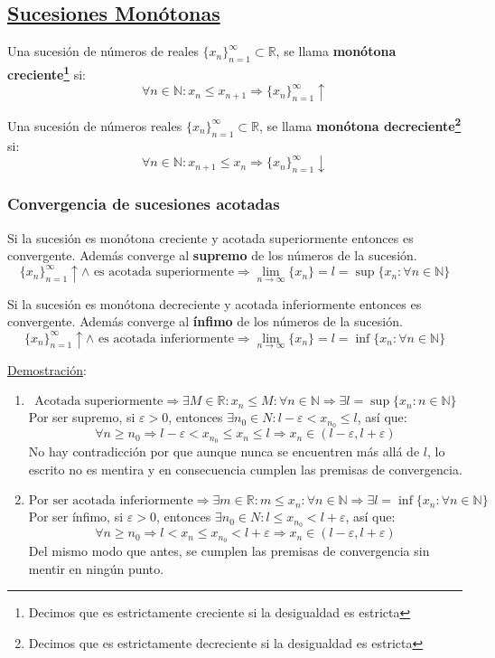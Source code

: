 \documentclass[10pt,a4paper,openright]{book}
\begin{document}
\subsection*{\underline{Sucesiones Monótonas}}
Una sucesión de números de reales $\{x_n\}_{n=1}^\infty\subset \mathbb R$, se llama \textbf{monótona creciente\footnote{Decimos que es estrictamente creciente si la desigualdad es estricta}} si:
$$\forall n\in \mathbb N: x_n\leq x_{n+1}\Rightarrow \{x_n\}_{n=1}^\infty \uparrow$$

Una sucesión de números reales $\{x_n\}_{n=1}^\infty\subset \mathbb R$, se llama \textbf{monótona decreciente\footnote{Decimos que es estrictamente decreciente si la desigualdad es estricta}} si:
$$\forall n\in \mathbb N: x_{n+1}\leq x_n \Rightarrow \{x_n\}_{n=1}^\infty \downarrow$$

\subsubsection*{Convergencia de sucesiones acotadas}
Si la sucesión es monótona creciente y acotada superiormente entonces es convergente. Además converge al \textbf{supremo} de los números de la sucesión.
$$\{x_n\}_{n=1}^\infty \uparrow \wedge \mbox{ es acotada superiormente}\Rightarrow \lim_{n\rightarrow \infty} \{x_n\}=l=\sup\{x_n: \forall n\in \mathbb N\}$$

Si la sucesión es monótona decreciente y acotada inferiormente entonces es convergente. Además converge al \textbf{ínfimo} de los números de la sucesión.
$$\{x_n\}_{n=1}^\infty \uparrow \wedge \mbox{ es acotada inferiormente}\Rightarrow \lim_{n\rightarrow \infty} \{x_n\}=l=\inf\{x_n: \forall n\in \mathbb N\}$$

\underline{Demostración}:\begin{enumerate}
\item 
$$\mbox{Acotada superiormente}\Rightarrow \exists M\in \mathbb R: x_n\leq M: \forall n\in \mathbb N\Rightarrow \exists l=\sup\{x_n: n\in \mathbb N\}$$
Por ser supremo, si $\varepsilon>0$, entonces $\exists n_0\in N: l-\varepsilon<x_{n_0}\leq l$, así que:
$$\forall n\geq n_0\Rightarrow l-\varepsilon< x_{n_0}\leq x_n\leq l \Rightarrow x_n\in (l-\varepsilon, l+\varepsilon)$$
No hay contradicción por que aunque nunca se encuentren más allá de $l$, lo escrito no es mentira y en consecuencia cumplen las premisas de convergencia.

\item 
$$\mbox{Por ser acotada inferiormente}\Rightarrow \exists m\in \mathbb R: m\leq x_n: \forall n\in \mathbb N\Rightarrow \exists l=\inf\{x_n: \forall n\in \mathbb N\}$$
Por ser ínfimo, si $\varepsilon>0$, entonces $\exists n_0\in N: l\leq x_{n_0}<l+\varepsilon$, así que:
$$\forall n\geq n_0\Rightarrow l< x_n\leq x_{n_0} <l+\varepsilon \Rightarrow x_n\in (l-\varepsilon, l+\varepsilon)$$
Del mismo modo que antes, se cumplen las premisas de convergencia sin mentir en ningún punto.
\end{enumerate}
\end{document}
